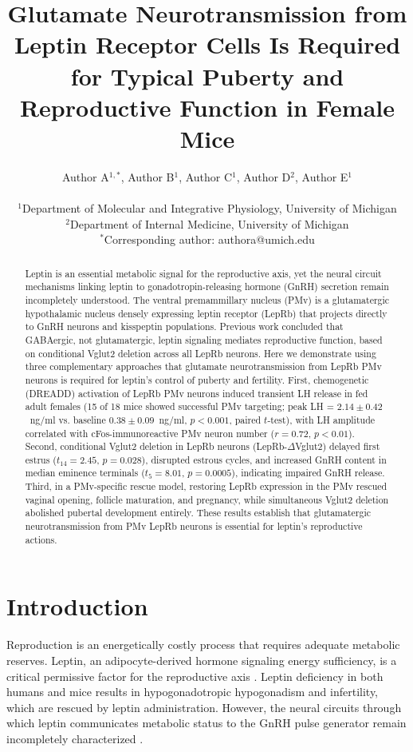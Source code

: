 \documentclass[11pt]{article}
\title{Glutamate Neurotransmission from Leptin Receptor Cells Is Required for Typical Puberty and Reproductive Function in Female Mice}
\author{
Author A$^{1,*}$, Author B$^{1}$, Author C$^{1}$, Author D$^{2}$, Author E$^{1}$ \\
\\
$^{1}$Department of Molecular and Integrative Physiology, University of Michigan \\
$^{2}$Department of Internal Medicine, University of Michigan \\
$^{*}$Corresponding author: authora@umich.edu
}
\date{}
\begin{document}
\maketitle

\begin{abstract}
Leptin is an essential metabolic signal for the reproductive axis, yet the neural circuit mechanisms linking leptin to gonadotropin-releasing hormone (GnRH) secretion remain incompletely understood. The ventral premammillary nucleus (PMv) is a glutamatergic hypothalamic nucleus densely expressing leptin receptor (LepRb) that projects directly to GnRH neurons and kisspeptin populations. Previous work concluded that GABAergic, not glutamatergic, leptin signaling mediates reproductive function, based on conditional Vglut2 deletion across all LepRb neurons. Here we demonstrate using three complementary approaches that glutamate neurotransmission from LepRb PMv neurons is required for leptin's control of puberty and fertility. First, chemogenetic (DREADD) activation of LepRb PMv neurons induced transient LH release in fed adult females (15 of 18 mice showed successful PMv targeting; peak LH = $2.14 \pm 0.42$~ng/ml vs. baseline $0.38 \pm 0.09$~ng/ml, $p < 0.001$, paired $t$-test), with LH amplitude correlated with cFos-immunoreactive PMv neuron number ($r = 0.72$, $p < 0.01$). Second, conditional Vglut2 deletion in LepRb neurons (LepRb-$\Delta$Vglut2) delayed first estrus ($t_{14} = 2.45$, $p = 0.028$), disrupted estrous cycles, and increased GnRH content in median eminence terminals ($t_5 = 8.01$, $p = 0.0005$), indicating impaired GnRH release. Third, in a PMv-specific rescue model, restoring LepRb expression in the PMv rescued vaginal opening, follicle maturation, and pregnancy, while simultaneous Vglut2 deletion abolished pubertal development entirely. These results establish that glutamatergic neurotransmission from PMv LepRb neurons is essential for leptin's reproductive actions.
\end{abstract}

\section{Introduction}

Reproduction is an energetically costly process that requires adequate metabolic reserves. Leptin, an adipocyte-derived hormone signaling energy sufficiency, is a critical permissive factor for the reproductive axis \citep{ahima1996leptin, barash1996leptin}. Leptin deficiency in both humans and mice results in hypogonadotropic hypogonadism and infertility, which are rescued by leptin administration. However, the neural circuits through which leptin communicates metabolic status to the GnRH pulse generator remain incompletely characterized \citep{herbison2016gnrh}.
\end{document}
